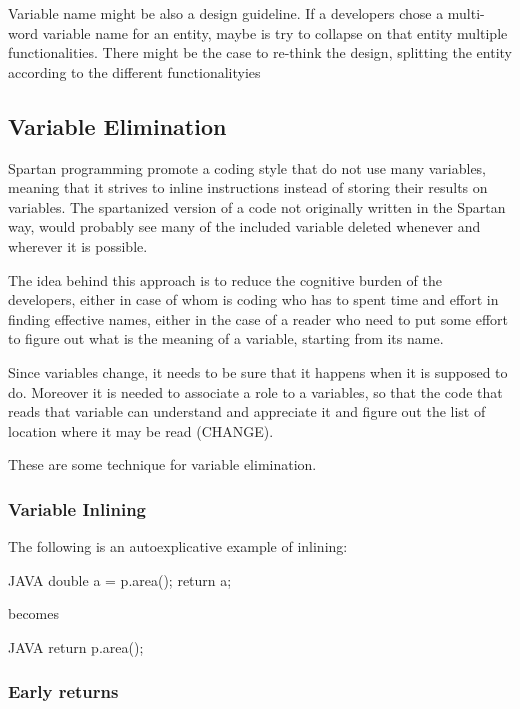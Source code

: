 Variable name might be also a design guideline. If a developers chose a multi-word variable name for an 
entity, maybe is try to collapse on that entity multiple functionalities. 
There might be the case to re-think the design, splitting the entity according to the different functionalityies 

\subsection{Variable Elimination}

Spartan programming promote a coding style that do not use many variables, meaning that it strives to inline instructions instead of 
storing their results on variables. The spartanized version of a code not originally written in the Spartan way, would 
probably see many of the included variable deleted whenever and wherever it is possible.

The idea behind this approach is to reduce the cognitive burden of the developers, either in case of whom is coding who has to spent
time and effort in finding effective names, either in the case of a reader who need to put some effort to figure out what is the meaning of 
a variable, starting from its name. 

Since variables change, it needs to be sure that it happens when it is supposed to do. Moreover it is needed to associate a role to a variables,
so that the code that reads that variable can understand and appreciate it and figure out the list of location where it may be read (CHANGE).

These are some technique for variable elimination.

\subsubsection{Variable Inlining}

The following is an autoexplicative example of inlining:

\begin{code}{JAVA}
double a = p.area();
return a; 
\end{code}

becomes

\begin{code}{JAVA}
return p.area();  
\end{code}

\subsubsection{Early returns} 

